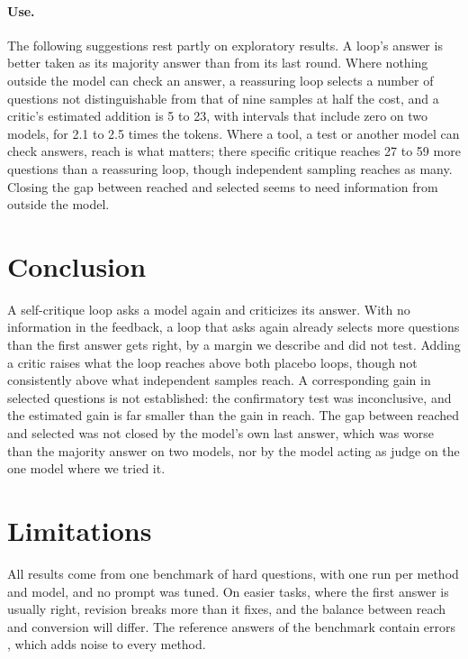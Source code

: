 \documentclass[11pt]{article}
\begin{document}
\paragraph{Use.}
The following suggestions rest partly on exploratory results.
A loop's answer is better taken as its majority answer than from its last round.
Where nothing outside the model can check an answer, a reassuring loop selects a number of questions not distinguishable from that of nine samples at half the cost, and a critic's estimated addition is 5 to 23, with intervals that include zero on two models, for 2.1 to 2.5 times the tokens.
Where a tool, a test or another model can check answers, reach is what matters; there specific critique reaches 27 to 59 more questions than a reassuring loop, though independent sampling reaches as many.
Closing the gap between reached and selected seems to need information from outside the model.

\section{Conclusion}

A self-critique loop asks a model again and criticizes its answer.
With no information in the feedback, a loop that asks again already selects more questions than the first answer gets right, by a margin we describe and did not test.
Adding a critic raises what the loop reaches above both placebo loops, though not consistently above what independent samples reach.
A corresponding gain in selected questions is not established: the confirmatory test was inconclusive, and the estimated gain is far smaller than the gain in reach.
The gap between reached and selected was not closed by the model's own last answer, which was worse than the majority answer on two models, nor by the model acting as judge on the one model where we tried it.

\section*{Limitations}

All results come from one benchmark of hard questions, with one run per method and model, and no prompt was tuned.
On easier tasks, where the first answer is usually right, revision breaks more than it fixes, and the balance between reach and conversion will differ.
The reference answers of the benchmark contain errors \citep{zhai2026hleverified}, which adds noise to every method.
\end{document}
